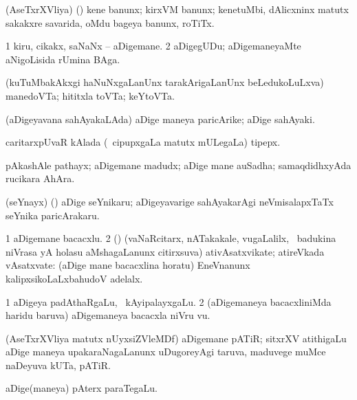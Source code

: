 \bentry
{}
\gl{\nA}
\bmng
(AseTxrXVliya) (\ashi) kene banunx; kirxVM banunx; kenetuMbi, dAlicxninx matutx sakakxre savarida, oMdu bageya banunx, roTiTx. 
\emng
\eentry

\bentry
{}
\gl{\nA}
\bmng
\bnum
\num{1} kiru, cikakx, saNaNx -- aDigemane. 
\num{2} aDigegUDu; aDigemaneyaMte aNigoLisida rUmina BAga. 
\enum
\emng
\eentry

\bentry
{}
\gl{\nA}
\bmng
(kuTuMbakAkxgi haNuNxgaLanUnx tarakArigaLanUnx beLedukoLuLxva) manedoVTa; hititxla toVTa; keYtoVTa. 
\emng
\eentry

\bentry
{}
\gl{\nA}
\bmng
(aDigeyavana sahAyakaLAda) aDige maneya paricArike; aDige sahAyaki. 
\emng
\eentry

\bentry
{}
\gl{\nA}
\bmng
caritarxpUvaR kAlada (\kanmu\ cipupxgaLa matutx mULegaLa) tipepx. 
\emng
\eentry

\bentry
{}
\gl{\nA}
\bmng
pAkashAle pathayx; aDigemane madudx; aDige mane auSadha; samaqdidhxyAda rucikara AhAra. 
\emng
\eentry

\bentry
{}
\gl{\nA}
\bmng
(seYnayx) (\ame) aDige seYnikaru; aDigeyavarige sahAyakarAgi neVmisalapxTaTx seYnika paricArakaru. 
\emng
\eentry

\bentry
{}
\gl{\nA}
\bmng
\bnum
\num{1} aDigemane bacacxlu. 
\num{2} (\rUpa) (vaNaRcitarx, nATakakale, \mo vugaLalilx, \kanmu\ badukina niVrasa yA holasu aMshagaLanunx citirxsuva) ativAsatxvikate; atireVkada vAsatxvate:  (aDige mane bacacxlina horatu) EneVnanunx kalipxsikoLaLxbahudoV adelalx. 
\enum
\emng
\eentry

\bentry
{}
\gl{\nA}
\bmng
\bnum
\num{1} aDigeya padAthaRgaLu, \kanmu\ kAyipalayxgaLu. 
\num{2} (aDigemaneya bacacxliniMda haridu baruva) aDigemaneya bacacxla niVru \mo vu. 
\enum
\emng
\eentry

\bentry
{}
\gl{\nA}
\bmng
(AseTxrXVliya matutx nUyxsiZVleMDf) aDigemane pATiR; sitxrXV atithigaLu aDige maneya upakaraNagaLanunx uDugoreyAgi taruva, maduvege muMce naDeyuva kUTa, pATiR. 
\emng
\eentry

\bentry
{}
\gl{\nA}
\bmng
aDige(maneya) pAterx paraTegaLu. 
\emng
\eentry

